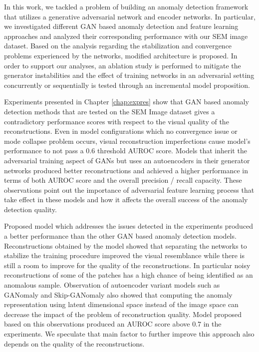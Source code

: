 
\begingroup

	
In this work, we tackled a problem of building an anomaly detection framework that utilizes a 
generative adversarial network and encoder networks. In particular, we investigated different 
GAN based anomaly detection and feature learning approaches and analyzed their corresponding 
performance with our SEM image dataset. Based on the analysis regarding the stabilization and 
convergence problems experienced by the networks, modified architecture is proposed. In order to support 
our analyses, an ablation study is performed to mitigate the generator instabilities and the 
effect of training networks in an adversarial setting concurrently or sequentially is tested through 
an incremental model proposition.

Experiments presented in Chapter \ref{chap:expres} show that GAN based anomaly detection methods that 
are tested on the SEM Image dataset gives a contradictory performance scores with respect to the visual 
quality of the reconstructions. Even in model configurations which no convergence issue or mode collapse problem 
occurs, visual reconstruction imperfections cause model's performance to not pass a $0.6$ threshold AUROC score.
Models that inherit the adversarial training aspect of GANs but uses an autoencoders in 
their generator networks produced better reconstructions and achieved a higher performance in terms 
of both AUROC score and the overall precision / recall capacity. These observations point out the importance 
of adversarial feature learning process that take effect in these models and how it affects the overall success 
of the anomaly detection quality.

Proposed model which addresses the issues detected in the experiments produced a better performance 
than the other GAN based anomaly detection models. Reconstructions obtained by the model showed that 
separating the networks to stabilize the training procedure improved the visual resemblance while there 
is still a room to improve for the quality of the reconstructions. In particular noisy reconstructions of 
some of the patches has a high chance of being identified as an anomalous sample. Observation of autoencoder 
variant models such as GANomaly and Skip-GANomaly also showed that computing the anomaly representation using 
latent dimensional space instead of the image space can decrease the impact of the problem of reconstruction quality. 
Model proposed based on this observations produced an AUROC score above $0.7$ in the experiments. We speculate 
that main factor to further improve this approach also depends on the quality of the reconstructions.

